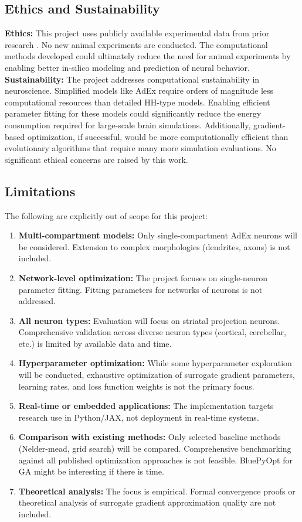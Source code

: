 \documentclass{article}
\begin{document}
\subsection{Ethics and Sustainability}
\textbf{Ethics:}
This project uses publicly available experimental data from prior research \cite{Johansson2020}.
No new animal experiments are conducted.
The computational methods developed could ultimately reduce the need for animal experiments by enabling better in-silico modeling and prediction of neural behavior.\\
\textbf{Sustainability:}
The project addresses computational sustainability in neuroscience.
Simplified models like AdEx require orders of magnitude less computational resources than detailed HH-type models.
Enabling efficient parameter fitting for these models could significantly reduce the energy consumption required for large-scale brain simulations.
Additionally, gradient-based optimization, if successful, would be more computationally efficient than evolutionary algorithms that require many more simulation evaluations.
No significant ethical concerns are raised by this work.

\subsection{Limitations}

The following are explicitly out of scope for this project:

\begin{enumerate}
    \item \textbf{Multi-compartment models:} Only single-compartment AdEx neurons will be considered. Extension to complex morphologies (dendrites, axons) is not included.
    \item \textbf{Network-level optimization:} The project focuses on single-neuron parameter fitting. Fitting parameters for networks of neurons is not addressed.
    \item \textbf{All neuron types:} Evaluation will focus on striatal projection neurons. Comprehensive validation across diverse neuron types (cortical, cerebellar, etc.) is limited by available data and time.
    \item \textbf{Hyperparameter optimization:} While some hyperparameter exploration will be conducted, exhaustive optimization of surrogate gradient parameters, learning rates, and loss function weights is not the primary focus.
    \item \textbf{Real-time or embedded applications:} The implementation targets research use in Python/JAX, not deployment in real-time systems.
    \item \textbf{Comparison with existing methods:} Only selected baseline methods (Nelder-mead, grid search) will be compared. 
      Comprehensive benchmarking against all published optimization approaches is not feasible.
      BluePyOpt for GA might be interesting if there is time.
    \item \textbf{Theoretical analysis:} The focus is empirical. Formal convergence proofs or theoretical analysis of surrogate gradient approximation quality are not included.
\end{enumerate}
\end{document}
